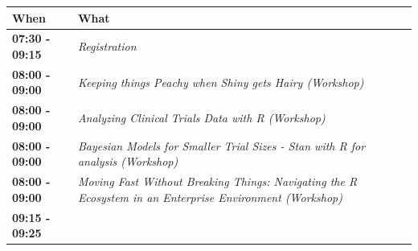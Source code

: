\documentclass[]{book}
\theoremstyle{definition}
\theoremstyle{definition}
\theoremstyle{definition}
\theoremstyle{remark}
\begin{document}
\begin{longtable}[]{@{}ll@{}}
\toprule
\begin{minipage}[b]{0.47\columnwidth}\raggedright
When\strut
\end{minipage} & \begin{minipage}[b]{0.47\columnwidth}\raggedright
What\strut
\end{minipage}\tabularnewline
\midrule
\endhead
\begin{minipage}[t]{0.47\columnwidth}\raggedright
\textbf{07:30 - 09:15}\strut
\end{minipage} & \begin{minipage}[t]{0.47\columnwidth}\raggedright
\emph{Registration}\strut
\end{minipage}\tabularnewline
\begin{minipage}[t]{0.47\columnwidth}\raggedright
\textbf{08:00 - 09:00}\strut
\end{minipage} & \begin{minipage}[t]{0.47\columnwidth}\raggedright
\emph{Keeping things Peachy when Shiny gets Hairy (Workshop)}\strut
\end{minipage}\tabularnewline
\begin{minipage}[t]{0.47\columnwidth}\raggedright
\textbf{08:00 - 09:00}\strut
\end{minipage} & \begin{minipage}[t]{0.47\columnwidth}\raggedright
\emph{Analyzing Clinical Trials Data with R (Workshop)}\strut
\end{minipage}\tabularnewline
\begin{minipage}[t]{0.47\columnwidth}\raggedright
\textbf{08:00 - 09:00}\strut
\end{minipage} & \begin{minipage}[t]{0.47\columnwidth}\raggedright
\emph{Bayesian Models for Smaller Trial Sizes - Stan with R for analysis
(Workshop)}\strut
\end{minipage}\tabularnewline
\begin{minipage}[t]{0.47\columnwidth}\raggedright
\textbf{08:00 - 09:00}\strut
\end{minipage} & \begin{minipage}[t]{0.47\columnwidth}\raggedright
\emph{Moving Fast Without Breaking Things: Navigating the R Ecosystem in
an Enterprise Environment (Workshop)}\strut
\end{minipage}\tabularnewline
\begin{minipage}[t]{0.47\columnwidth}\raggedright
\textbf{09:15 - 09:25}\strut
\end{minipage} & \begin{minipage}[t]{0.47\columnwidth}\raggedright

\end{minipage}
\end{longtable}
\end{document}
